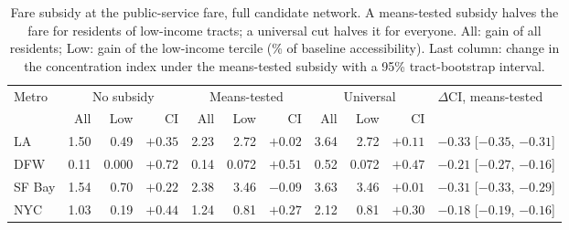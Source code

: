 \begin{table}[!htbp]
\centering
\caption{Fare subsidy at the public-service fare, full candidate network. A means-tested subsidy halves the fare for residents of low-income tracts; a universal cut halves it for everyone. All: gain of all residents; Low: gain of the low-income tercile (\% of baseline accessibility). Last column: change in the concentration index under the means-tested subsidy with a 95\% tract-bootstrap interval.}
\label{tab:subsidy}
\footnotesize
\begin{tabular}{lrrrrrrrrrl}
\toprule
Metro & \multicolumn{3}{c}{No subsidy} & \multicolumn{3}{c}{Means-tested} & \multicolumn{3}{c}{Universal} & $\Delta$CI, means-tested \\
 & All & Low & CI & All & Low & CI & All & Low & CI & \\
\midrule
LA & 1.50 & 0.49 & $+0.35$ & 2.23 & 2.72 & $+0.02$ & 3.64 & 2.72 & $+0.11$ & $-0.33$ [$-0.35$, $-0.31$] \\
DFW & 0.11 & 0.000 & $+0.72$ & 0.14 & 0.072 & $+0.51$ & 0.52 & 0.072 & $+0.47$ & $-0.21$ [$-0.27$, $-0.16$] \\
SF Bay & 1.54 & 0.70 & $+0.22$ & 2.38 & 3.46 & $-0.09$ & 3.63 & 3.46 & $+0.01$ & $-0.31$ [$-0.33$, $-0.29$] \\
NYC & 1.03 & 0.19 & $+0.44$ & 1.24 & 0.81 & $+0.27$ & 2.12 & 0.81 & $+0.30$ & $-0.18$ [$-0.19$, $-0.16$] \\
\bottomrule
\end{tabular}
\end{table}
